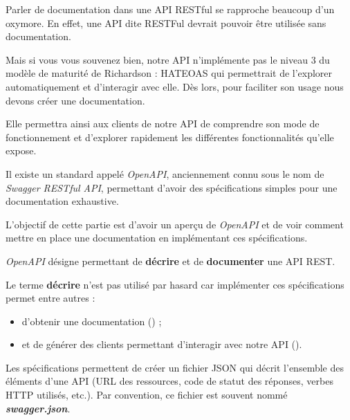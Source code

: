 \documentclass[big]{zmdocument}
\begin{document}
Parler de documentation dans une API RESTful se rapproche beaucoup d'un oxymore. En effet, une API dite RESTFul devrait pouvoir être utilisée sans documentation.



Mais si vous vous souvenez bien, notre API n'implémente pas le niveau 3 du modèle de maturité de Richardson : HATEOAS qui permettrait de l'explorer automatiquement et d'interagir avec elle. Dès lors, pour faciliter son usage nous devons créer une documentation.



Elle permettra ainsi aux clients de notre API de comprendre son mode de fonctionnement et d'explorer rapidement les différentes fonctionnalités qu'elle expose.



Il existe un standard appelé \textit{OpenAPI}, anciennement connu sous le nom de \textit{Swagger RESTful API}, permettant d'avoir des spécifications simples pour une documentation exhaustive.



L'objectif de cette partie est d'avoir un aperçu de \textit{OpenAPI} et de voir comment mettre en place une documentation en implémentant ces spécifications.





\textit{OpenAPI} désigne  permettant de \textbf{décrire} et de \textbf{documenter} une API REST.



Le terme \textbf{décrire} n'est pas utilisé par hasard car implémenter ces spécifications permet entre autres :



\begin{itemize}
\item d'obtenir une documentation () ;
\item et de générer des clients permettant d'interagir avec notre API ().
\end{itemize}


Les spécifications permettent de créer un fichier JSON qui décrit l'ensemble des éléments d'une API (URL des ressources, code de statut des réponses, verbes HTTP utilisés, etc.). Par convention, ce fichier est souvent nommé \textbf{\textit{swagger.json}}.
\end{document}
